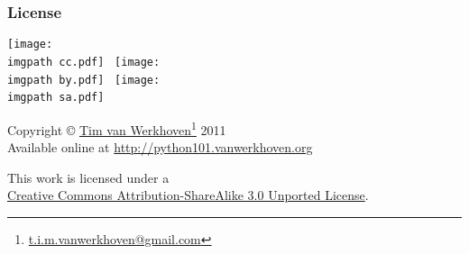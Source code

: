 \documentclass[xetex,10pt]{beamer}
\def\imgpath{./img/}
\def\spacer{\vspace*{1em}}
\begin{document}
\begin{frame}
	\frametitle{License}

	\begin{center}
	\texttt{[image: \\imgpath cc.pdf]}~
	\texttt{[image: \\imgpath by.pdf]}~
	\texttt{[image: \\imgpath sa.pdf]}~
	
	\spacer

	Copyright © \href{https://www.staff.science.uu.nl/~werkh108/}{Tim van Werkhoven}\footnote[frame]{\url{t.i.m.vanwerkhoven@gmail.com}} 2011\\
	Available online at \url{http://python101.vanwerkhoven.org}
	
	\spacer

	This work is licensed under a\\
	\href{http://creativecommons.org/licenses/by-sa/3.0/}{Creative Commons Attribution-ShareAlike 3.0 Unported License}.

	\end{center}
	
\end{frame}
\end{document}
